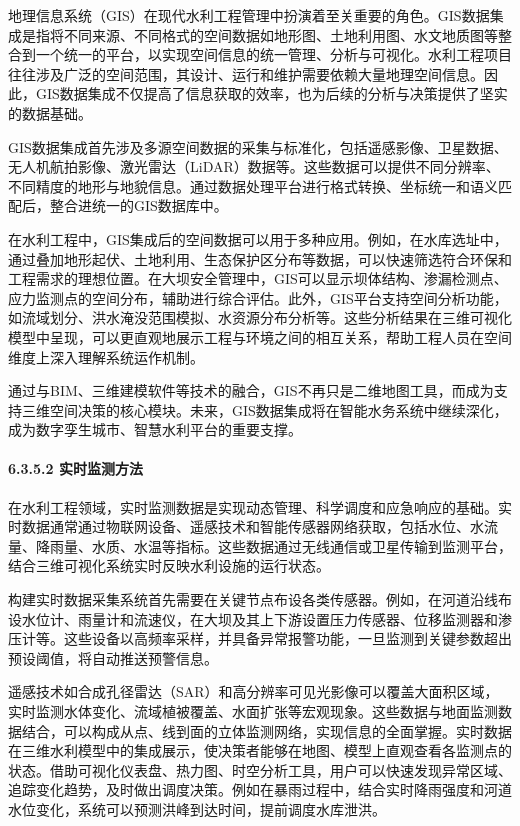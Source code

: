 地理信息系统（GIS）在现代水利工程管理中扮演着至关重要的角色。GIS数据集成是指将不同来源、不同格式的空间数据如地形图、土地利用图、水文地质图等整合到一个统一的平台，以实现空间信息的统一管理、分析与可视化。水利工程项目往往涉及广泛的空间范围，其设计、运行和维护需要依赖大量地理空间信息。因此，GIS数据集成不仅提高了信息获取的效率，也为后续的分析与决策提供了坚实的数据基础。

GIS数据集成首先涉及多源空间数据的采集与标准化，包括遥感影像、卫星数据、无人机航拍影像、激光雷达（LiDAR）数据等。这些数据可以提供不同分辨率、不同精度的地形与地貌信息。通过数据处理平台进行格式转换、坐标统一和语义匹配后，整合进统一的GIS数据库中。

在水利工程中，GIS集成后的空间数据可以用于多种应用。例如，在水库选址中，通过叠加地形起伏、土地利用、生态保护区分布等数据，可以快速筛选符合环保和工程需求的理想位置。在大坝安全管理中，GIS可以显示坝体结构、渗漏检测点、应力监测点的空间分布，辅助进行综合评估。此外，GIS平台支持空间分析功能，如流域划分、洪水淹没范围模拟、水资源分布分析等。这些分析结果在三维可视化模型中呈现，可以更直观地展示工程与环境之间的相互关系，帮助工程人员在空间维度上深入理解系统运作机制。

通过与BIM、三维建模软件等技术的融合，GIS不再只是二维地图工具，而成为支持三维空间决策的核心模块。未来，GIS数据集成将在智能水务系统中继续深化，成为数字孪生城市、智慧水利平台的重要支撑。

\paragraph{6.3.5.2 实时监测方法}\label{ux5b9eux65f6ux76d1ux6d4bux65b9ux6cd5}

在水利工程领域，实时监测数据是实现动态管理、科学调度和应急响应的基础。实时数据通常通过物联网设备、遥感技术和智能传感器网络获取，包括水位、水流量、降雨量、水质、水温等指标。这些数据通过无线通信或卫星传输到监测平台，结合三维可视化系统实时反映水利设施的运行状态。

构建实时数据采集系统首先需要在关键节点布设各类传感器。例如，在河道沿线布设水位计、雨量计和流速仪，在大坝及其上下游设置压力传感器、位移监测器和渗压计等。这些设备以高频率采样，并具备异常报警功能，一旦监测到关键参数超出预设阈值，将自动推送预警信息。

遥感技术如合成孔径雷达（SAR）和高分辨率可见光影像可以覆盖大面积区域，实时监测水体变化、流域植被覆盖、水面扩张等宏观现象。这些数据与地面监测数据结合，可以构成从点、线到面的立体监测网络，实现信息的全面掌握。实时数据在三维水利模型中的集成展示，使决策者能够在地图、模型上直观查看各监测点的状态。借助可视化仪表盘、热力图、时空分析工具，用户可以快速发现异常区域、追踪变化趋势，及时做出调度决策。例如在暴雨过程中，结合实时降雨强度和河道水位变化，系统可以预测洪峰到达时间，提前调度水库泄洪。

